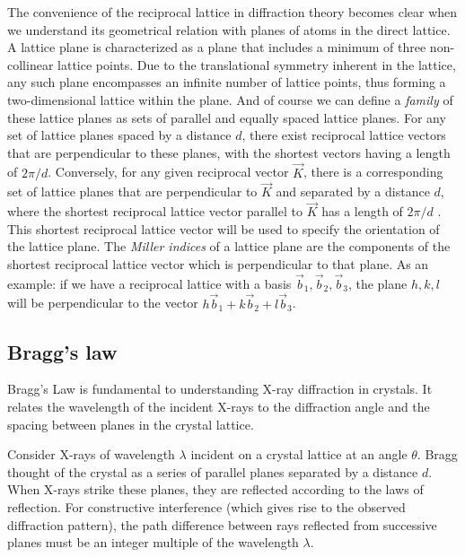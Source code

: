 \documentclass{article}
\begin{document}
The convenience of the reciprocal lattice in diffraction theory becomes clear when we understand its geometrical relation with planes of atoms in the direct lattice. A lattice plane is characterized as a plane that includes a minimum of three non-collinear lattice points. Due to the translational symmetry inherent in the lattice, any such plane encompasses an infinite number of lattice points, thus forming a two-dimensional lattice within the plane. And of course we can define a \textit{family} of these lattice planes as sets of parallel and equally spaced lattice planes. For any set of lattice planes spaced by a distance $d$, there exist reciprocal lattice vectors that are perpendicular to these planes, with the shortest vectors having a length of $2\pi/d$. Conversely, for any given reciprocal vector $\vec{K}$, there is a corresponding set of lattice planes that are perpendicular to $\vec{K}$ and separated by a distance $d$, where the shortest reciprocal lattice vector parallel to $\vec{K}$ has a length of $2\pi/d$ \cite{ashcroft_1976_solid}. This shortest reciprocal lattice vector will be used to specify the orientation of the lattice plane. The \textit{Miller indices} of a lattice plane are the components of the shortest reciprocal lattice vector which is perpendicular to that plane. As an example: if we have a reciprocal lattice with a basis $\vec{b}_1, \vec{b}_2, \vec{b}_3$, the plane $h,k,l$ will be perpendicular to the vector $h\vec{b}_1 + k\vec{b}_2 + l\vec{b}_3$.

\pagebreak{}

\subsection{Bragg's law}

Bragg's Law is fundamental to understanding X-ray diffraction in crystals. It relates the wavelength of the incident X-rays to the diffraction angle and the spacing between planes in the crystal lattice.

Consider X-rays of wavelength $\lambda$ incident on a crystal lattice at an angle $\theta$. Bragg thought of the crystal as a series of parallel planes separated by a distance $d$. When X-rays strike these planes, they are reflected according to the laws of reflection. For constructive interference (which gives rise to the observed diffraction pattern), the path difference between rays reflected from successive planes must be an integer multiple of the wavelength $\lambda$. 
\end{document}
